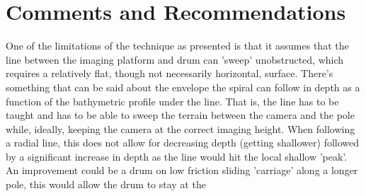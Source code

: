 \section{Comments and Recommendations}


One of the limitations of the technique as presented is that it assumes that the line between the imaging platform and drum can 'sweep' unobstructed, which requires a relatively flat, though not necessarily horizontal, surface. There's something that can be said about the envelope the spiral can follow in depth as a function of the bathymetric profile under the line. That is, the line has to be taught and has to be able to sweep the terrain between the camera and the pole while, ideally, keeping the camera at the correct imaging height. When following a radial line, this does not allow for decreasing depth (getting shallower) followed by a significant increase in depth as the line would hit the local shallow 'peak'. An improvement could be a drum on low friction sliding 'carriage' along a longer pole, this would allow the drum to stay at the 
